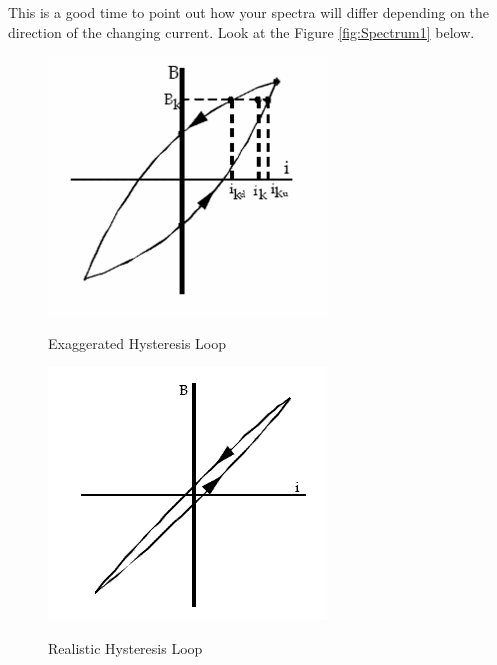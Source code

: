 \documentclass{../lab}
\begin{document}
This is a good time to point out how your spectra will differ depending on the direction of the changing current. Look at the Figure \ref{fig:Spectrum1} below.

\begin{figure}[h]
\begin{minipage}[t]{.5\textwidth}
    \centering
    \href{http://experimentationlab.berkeley.edu/sites/default/files/images/280px-BRAimage028.gif}{\includegraphics[width=0.9\linewidth,keepaspectratio]{images/280px-BRAimage028.png}}
    \caption{Exaggerated Hysteresis Loop}
    \label{fig:Spectrum1}
\end{minipage}%
\begin{minipage}[t]{.5\textwidth}
    \centering
    \href{http://experimentationlab.berkeley.edu/sites/default/files/images/BRAimage029.gif}{\includegraphics[width=0.9\linewidth,keepaspectratio]{images/BRAimage029.png}}
    \caption{Realistic Hysteresis Loop}
    \label{fig:Spectrum2}
\end{minipage}
\end{figure}
\end{document}
